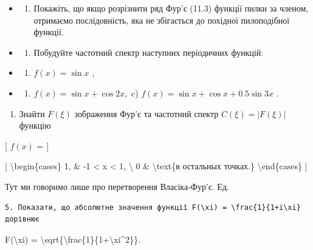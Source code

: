\documentclass[
]{article}
\providecommand{\tightlist}{%
  \setlength{\itemsep}{0pt}\setlength{\parskip}{0pt}}
\begin{document}
{{\begin{itemize}
\tightlist
\item
  \begin{enumerate}
  \def\labelenumi{\arabic{enumi}.}
  \setcounter{enumi}{1}
  \tightlist
  \item
    Покажіть, що якщо розрізнити ряд Фур'є (11.3) функції пилки за
    членом, отримаємо послідовність, яка не збігається до похідної
    пилоподібної функції.
  \end{enumerate}
\item
  \begin{enumerate}
  \def\labelenumi{\arabic{enumi}.}
  \setcounter{enumi}{2}
  \tightlist
  \item
    Побудуйте частотний спектр наступних періодичних функцій:
  \end{enumerate}
\item
  \begin{enumerate}
  \def\labelenumi{\alph{enumi})}
  \tightlist
  \item
    \(f(x) = \sin x\) ,
  \end{enumerate}
\item
  \begin{enumerate}
  \def\labelenumi{\arabic{enumi})}
  \setcounter{enumi}{5}
  \tightlist
  \item
    \(f(x) = \sin x + \cos 2x,\) c)
    \(f(x) = \sin x + \cos x + 0.5 \sin 3x\) .
  \end{enumerate}
\end{itemize}

\begin{enumerate}
\def\labelenumi{\arabic{enumi}.}
\setcounter{enumi}{3}
\tightlist
\item
  Знайти \(F(\xi)\) зображення Фур'є та частотний спектр
  \(C(\xi) = |F(\xi)|\) функцію
\end{enumerate}

{[} \(f(x)\) = {]}

{[} \textbackslash begin\{cases\} 1, \& -1 \textless{} x \textless{} 1,
\textbackslash{} 0 \& \textbackslash text\{в остальных точках.\}
\textbackslash end\{cases\} {]}

Тут ми говоримо лише про перетворення Власіка-Фур'є. Ед.

\begin{verbatim}
5. Показати, що абсолютне значення функції F(\xi) = \frac{1}{1+i\xi} дорівнює
\end{verbatim}

\textbar F(\textbackslash xi)\textbar{} =
\textbackslash sqrt\{\textbackslash frac\{1\}\{1+\textbackslash xi\^{}2\}\}.

}}
\end{document}
